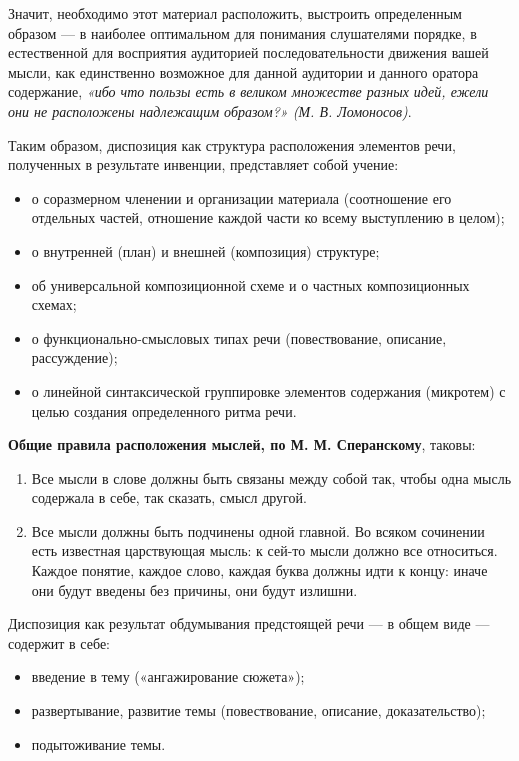 Значит, необходимо этот материал расположить, выстроить определенным образом — в наиболее оптимальном для понимания слушателями порядке, в естественной для восприятия аудиторией последовательности движения вашей мысли, как единственно возможное для данной аудитории и данного оратора содержание, \textit{«ибо что пользы есть в великом множестве разных идей, ежели они не расположены надлежащим образом?» (М. В. Ломоносов)}.

Таким образом, диспозиция как структура расположения элементов речи, полученных в результате инвенции, представляет собой учение:
\begin{itemize}
    \item  о соразмерном членении и организации материала (соотношение его отдельных частей, отношение каждой части ко всему выступлению в целом);
    \item о внутренней (план) и внешней (композиция) структуре;
    \item об универсальной композиционной схеме и о частных композиционных схемах;
    \item о функционально-смысловых типах речи (повествование, описание, рассуждение);
    \item о линейной синтаксической группировке элементов содержания (микротем) с целью создания определенного ритма речи.
\end{itemize}

\textbf{Общие правила расположения мыслей, по М. М. Сперанскому}, таковы:
\begin{enumerate}
    \item Все мысли в слове должны быть связаны между собой так, чтобы одна мысль содержала в себе, так сказать, смысл другой.
    \item Все мысли должны быть подчинены одной главной. Во всяком сочинении есть известная царствующая мысль: к сей-то мысли должно все относиться. Каждое понятие, каждое слово, каждая буква должны идти к концу: иначе они будут введены без причины, они будут излишни.
\end{enumerate}

Диспозиция как результат обдумывания предстоящей речи — в общем виде — содержит в себе: 
\begin{itemize}
    \item введение в тему («ангажирование сюжета»);
    \item развертывание, развитие темы (повествование, описание, доказательство);
    \item подытоживание темы.
\end{itemize}

